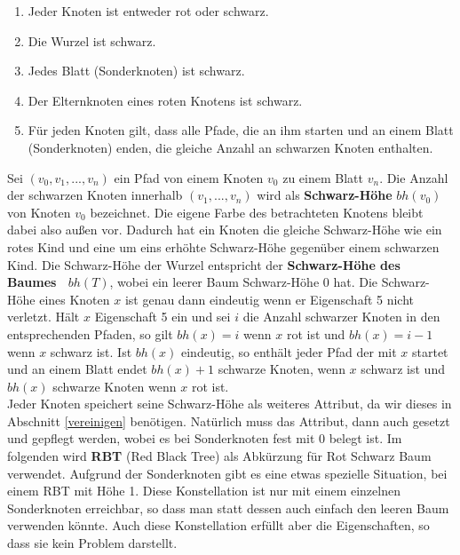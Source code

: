 \documentclass[a4paper,12pt]{article}
\begin{document}
\begin{enumerate}
	\item Jeder Knoten ist entweder rot oder schwarz.
	\item Die Wurzel ist schwarz.
	\item Jedes Blatt (Sonderknoten) ist schwarz.
	\item Der Elternknoten eines roten Knotens ist schwarz.
	\item Für jeden Knoten gilt, dass alle Pfade, die an ihm starten und an einem Blatt (Sonderknoten) enden, die gleiche Anzahl an schwarzen Knoten enthalten. 
\end{enumerate}  
Sei $(v_0,v_1,...,v_n)$ ein Pfad von einem Knoten $v_0$ zu einem Blatt $v_n$. Die Anzahl der schwarzen Knoten innerhalb $(v_1,...,v_n)$ wird als \textbf{Schwarz-Höhe} $\mathit{bh(v_0)}$ von Knoten $v_0$ bezeichnet. Die eigene Farbe des betrachteten Knotens bleibt dabei also außen vor. Dadurch hat ein Knoten die gleiche Schwarz-Höhe wie ein rotes Kind und eine um eins erhöhte Schwarz-Höhe gegenüber einem schwarzen Kind. Die Schwarz-Höhe der Wurzel entspricht der \textbf{Schwarz-Höhe des Baumes~ $bh(T)$}, wobei ein leerer Baum Schwarz-Höhe $0$ hat. Die Schwarz-Höhe eines Knoten $x$ ist genau dann eindeutig wenn er Eigenschaft 5 nicht verletzt. Hält $x$ Eigenschaft 5 ein und sei $i$ die Anzahl schwarzer Knoten in den entsprechenden Pfaden, so gilt $\mathit{bh(x)} = i$ wenn $x$ rot ist und $\mathit{bh(x)} = i - 1$ wenn $x$ schwarz ist. Ist $\mathit{bh(x)}$ eindeutig, so enthält jeder Pfad der mit $x$ startet und an einem Blatt endet $\mathit{bh(x)} + 1$ schwarze Knoten, wenn $x$ schwarz ist und  $\mathit{bh(x)}$ schwarze Knoten wenn $x$ rot ist.\\ Jeder Knoten speichert seine Schwarz-Höhe als weiteres Attribut, da wir dieses in Abschnitt \ref{vereinigen} benötigen. Natürlich muss das Attribut, dann auch gesetzt und gepflegt werden, wobei es bei Sonderknoten fest mit $0$ belegt ist. Im folgenden wird \textbf{RBT} (Red Black Tree) als Abkürzung für Rot Schwarz Baum verwendet. Aufgrund der Sonderknoten gibt es eine etwas spezielle Situation, bei einem RBT mit Höhe 1. Diese Konstellation ist nur mit einem einzelnen Sonderknoten erreichbar, so dass man statt dessen auch einfach den leeren Baum verwenden könnte. Auch diese Konstellation erfüllt aber die Eigenschaften, so dass sie kein Problem darstellt. \\
\end{document}

